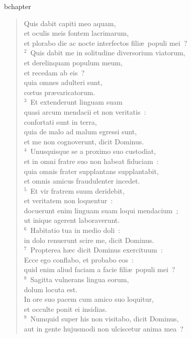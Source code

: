 bchapter\begin{verse}\vspace{-19pt}Quis dabit capiti meo aquam,\\ et oculis meis fontem lacrimarum,\\ et plorabo die ac nocte interfectos fili\ae\ populi mei~?\\
${}^{2}$~Quis dabit me in solitudine diversorium viatorum,\\ et derelinquam populum meum,\\ et recedam ab eis~?\\ quia omnes adulteri sunt,\\ cœtus pr\ae varicatorum.\\
${}^{3}$~Et extenderunt linguam suam\\ quasi arcum mendacii et non veritatis~:\\ confortati sunt in terra,\\ quia de malo ad malum egressi sunt,\\ et me non cognoverunt, dicit Dominus.\\
${}^{4}$~Unusquisque se a proximo suo custodiat,\\ et in omni fratre suo non habeat fiduciam~:\\ quia omnis frater supplantans supplantabit,\\ et omnis amicus fraudulenter incedet.\\
${}^{5}$~Et vir fratrem suum deridebit,\\ et veritatem non loquentur~:\\ docuerunt enim linguam suam loqui mendacium~;\\ ut inique agerent laboraverunt.\\
${}^{6}$~Habitatio tua in medio doli~:\\ in dolo renuerunt scire me, dicit Dominus.\\
${}^{7}$~Propterea h\ae c dicit Dominus exercituum~:\\ Ecce ego conflabo, et probabo eos~:\\ quid enim aliud faciam a facie fili\ae\ populi mei~?\\
${}^{8}$~Sagitta vulnerans lingua eorum,\\ dolum locuta est.\\ In ore suo pacem cum amico suo loquitur,\\ et occulte ponit ei insidias.\\
${}^{9}$~Numquid super his non visitabo, dicit Dominus,\\ aut in gente hujusmodi non ulciscetur anima mea~?\\

\end{verse}
